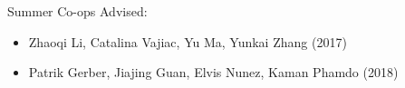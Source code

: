 \vspace{-0.3in}

Summer Co-ops Advised:
\begin{itemize}
 \itemsep 0pt
	\item Zhaoqi Li, Catalina Vajiac, Yu Ma, Yunkai Zhang (2017)
	\item Patrik Gerber, Jiajing Guan, Elvis Nunez, Kaman Phamdo (2018)
\end{itemize}

